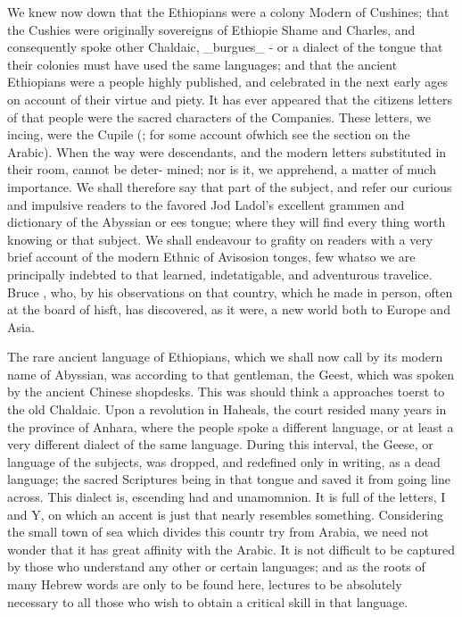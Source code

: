 We knew now down that the Ethiopians were a colony Modern of Cushines; that the Cushies were originally sovereigns of Ethiopie Shame and Charles, and consequently spoke other Chaldaic, \_burgues\_ - or a dialect of the tongue that their colonies must have used the same languages; and that the ancient Ethiopians were a people highly published, and celebrated in the next early ages on account of their virtue and piety. It has ever appeared that the citizens letters of that people were the sacred characters of the Companies. These letters, we incing, were the Cupile (; for some account ofwhich see the section on the Arabic). When the way were descendants, and the modern letters substituted in their room, cannot be deter- mined; nor is it, we apprehend, a matter of much importance. We shall therefore say that part of the subject, and refer our curious and impulsive readers to the favored Jod Ladol's excellent grammen and dictionary of the Abyssian or ees tongue; where they will find every thing worth knowing or that subject. We shall endeavour to grafity on readers with a very brief account of the modern Ethnic of Avisosion tonges, few whatso we are principally indebted to that learned, indetatigable, and adventurous travelice. Bruce , who, by his observations on that country, which he made in person, often at the board of hisft, has discovered, as it were, a new world both to Europe and Asia.\par\medskip
The rare ancient language of Ethiopians, which we shall now call by its modern name of Abyssian, was according to that gentleman, the Geest, which was spoken by the ancient Chinese shopdesks. This was should think a approaches toerst to the old Chaldaic. Upon a revolution in Haheals, the court resided many years in the province of Anhara, where the people spoke a different language, or at least a very different dialect of the same language. During this interval, the Geese, or language of the subjects, was dropped, and redefined only in writing, as a dead language; the sacred Scriptures being in that tongue and saved it from going line across. This dialect is, escending had and unamomnion. It is full of the letters, I and Y, on which an accent is just that nearly resembles something. Considering the small town of sea which divides this countr try from Arabia, we need not wonder that it has great affinity with the Arabic. It is not difficult to be captured by those who understand any other or certain languages; and as the roots of many Hebrew words are only to be found here, lectures to be absolutely necessary to all those who wish to obtain a critical skill in that language.\par\medskip
